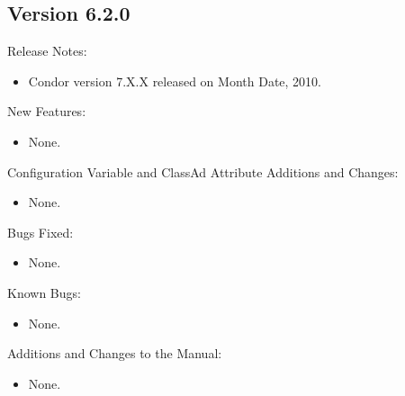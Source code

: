\subsection*{\label{sec:New-6-2-0}Version 6.2.0}

\noindent Release Notes:

\begin{itemize}

\item Condor version 7.X.X released on Month Date, 2010.

\end{itemize}


\noindent New Features:

\begin{itemize}

\item None.

\end{itemize}

\noindent Configuration Variable and ClassAd Attribute Additions and Changes:

\begin{itemize}

\item None.

\end{itemize}

\noindent Bugs Fixed:

\begin{itemize}

\item None.

\end{itemize}

\noindent Known Bugs:

\begin{itemize}

\item None.

\end{itemize}

\noindent Additions and Changes to the Manual:

\begin{itemize}

\item None.

\end{itemize}


